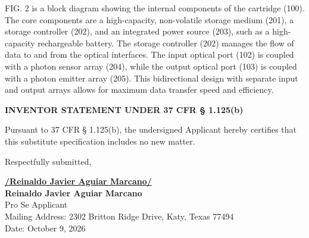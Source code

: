 \documentclass[11pt,letterpaper]{article}
\begin{document}
FIG. 2 is a block diagram showing the internal components of the cartridge (100). The core components are a high-capacity, non-volatile storage medium (201), a storage controller (202), and an integrated power source (203), such as a high-capacity rechargeable battery. The storage controller (202) manages the flow of data to and from the optical interfaces. The input optical port (102) is coupled with a photon sensor array (204), while the output optical port (103) is coupled with a photon emitter array (205). This bidirectional design with separate input and output arrays allows for maximum data transfer speed and efficiency.

\vspace{0.8cm}
\begin{center}
    \textbf{\large INVENTOR STATEMENT UNDER 37 CFR \S{} 1.125(b)}
\end{center}

Pursuant to 37 CFR \S{} 1.125(b), the undersigned Applicant hereby certifies that this substitute specification includes no new matter.

\vspace{0.6cm}
\begin{singlespace}
\noindent Respectfully submitted, \par\vspace{1.0cm}
\underline{\textbf{/Reinaldo Javier Aguiar Marcano/}} \\
\textbf{Reinaldo Javier Aguiar Marcano} \\
Pro Se Applicant \\
Mailing Address: 2302 Britton Ridge Drive, Katy, Texas 77494 \\
Date: October 9, 2026
\end{singlespace}
\end{document}
